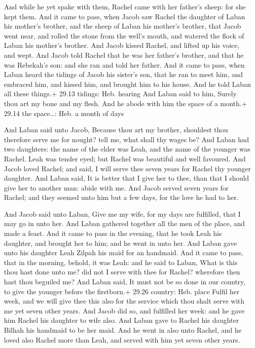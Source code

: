  And while he yet spake with them, Rachel came with her
father's sheep: for she kept them.  And it came to pass,
when Jacob saw Rachel the daughter of Laban his mother's brother, and
the sheep of Laban his mother's brother, that Jacob went near, and
rolled the stone from the well's mouth, and watered the flock of Laban
his mother's brother.  And Jacob kissed Rachel, and lifted
up his voice, and wept.  And Jacob told Rachel that he was
her father's brother, and that he was Rebekah's son: and she ran and
told her father.  And it came to pass, when Laban heard the
tidings of Jacob his sister's son, that he ran to meet him, and embraced
him, and kissed him, and brought him to his house. And he told Laban all
these things.+ 29.13 tidings: Heb. hearing  And Laban said
to him, Surely thou art my bone and my flesh. And he abode with him the
space of a month.+ 29.14 the space\ldots: Heb. a month of days

 And Laban said unto Jacob, Because thou art my brother,
shouldest thou therefore serve me for nought? tell me, what shall thy
wages be?  And Laban had two daughters: the name of the
elder was Leah, and the name of the younger was Rachel. 
Leah was tender eyed; but Rachel was beautiful and well favoured.
 And Jacob loved Rachel; and said, I will serve thee seven
years for Rachel thy younger daughter.  And Laban said, It
is better that I give her to thee, than that I should give her to
another man: abide with me.  And Jacob served seven years
for Rachel; and they seemed unto him but a few days, for the love he had
to her.

 And Jacob said unto Laban, Give me my wife, for my days
are fulfilled, that I may go in unto her.  And Laban
gathered together all the men of the place, and made a feast.
 And it came to pass in the evening, that he took Leah his
daughter, and brought her to him; and he went in unto her. 
And Laban gave unto his daughter Leah Zilpah his maid for an handmaid.
 And it came to pass, that in the morning, behold, it was
Leah: and he said to Laban, What is this thou hast done unto me? did not
I serve with thee for Rachel? wherefore then hast thou beguiled me?
 And Laban said, It must not be so done in our country, to
give the younger before the firstborn.+ 29.26 country: Heb. place
 Fulfil her week, and we will give thee this also for the
service which thou shalt serve with me yet seven other years.
 And Jacob did so, and fulfilled her week: and he gave him
Rachel his daughter to wife also.  And Laban gave to Rachel
his daughter Bilhah his handmaid to be her maid.  And he
went in also unto Rachel, and he loved also Rachel more than Leah, and
served with him yet seven other years.

